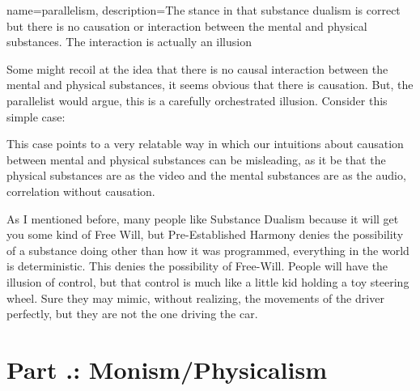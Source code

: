 {
name=parallelism,
description={The stance in that substance dualism is correct but there is no causation or interaction between the mental and physical substances. The interaction is actually an illusion}
}

Some might recoil at the idea that there is no causal interaction between the mental and physical substances, it seems obvious that there is causation. But, the parallelist would argue, this is a carefully orchestrated illusion. Consider this simple case:


This case points to a very relatable way in which our intuitions about causation between mental and physical substances can be misleading, as it be that the physical substances are as the video and the mental substances are as the audio, correlation without causation. 

As I mentioned before, many people like Substance Dualism because it will get you some kind of Free Will, but Pre-Established Harmony denies the possibility of a substance doing other than how it was programmed, everything in the world is deterministic. This denies the possibility of Free-Will. People will have the illusion of control, but that control is much like a little kid holding a toy steering wheel. Sure they may mimic, without realizing, the movements of the driver perfectly, but they are not the one driving the car. 

\section{Part \thechapcount.\theseccount: Monism/Physicalism}


